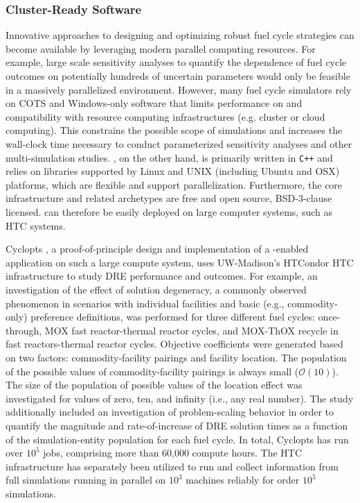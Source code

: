 \subsubsection{Cluster-Ready Software}

Innovative approaches to designing and optimizing robust fuel cycle strategies can become available by leveraging modern parallel computing resources.  For example, large scale sensitivity analyses to quantify the dependence of fuel cycle outcomes on potentially hundreds of uncertain parameters would only be feasible in a massively parallelized environment.
However, many fuel cycle simulators rely on \gls{COTS} and Windows-only software that limits
performance on and compatibility with resource computing infrastructures (e.g. 
cluster or cloud computing). This
constrains the possible scope of simulations and increases the wall-clock time necessary to conduct parameterized sensitivity
analyses and other multi-simulation studies. \Cyclus, on the other hand, is
primarily written in \texttt{C++} and relies on
libraries supported by Linux and UNIX (including Ubuntu and OSX) platforms,
which are flexible and support parallelization.
Furthermore, the core infrastructure and related archetypes are free and
open source, BSD-3-clause licensed.  \Cyclus can therefore be easily deployed
on large computer systems, such as \gls{HTC} systems.

Cyclopts \cite{gidden_cyclopts_2015}, a proof-of-principle design and
implementation of a \Cyclus-enabled application on such a large compute system,
uses UW-Madison's HTCondor \gls{HTC} infrastructure to study DRE performance and
outcomes. For example, an investigation of the effect of solution degeneracy, a
commonly observed phenomenon in scenarios with individual facilities and basic
(e.g., commodity-only) preference definitions, was performed for three different
fuel cycles: once-through, \gls{MOX} fast reactor-thermal reactor cycles, and
\gls{MOX}-\gls{ThOX} recycle in fast reactors-thermal reactor cycles. Objective
coefficients were generated based on two factors: commodity-facility pairings
and facility location. The population of the possible values of
commodity-facility pairings is always small ($\mathcal{O}(10)$). The size of the
population of possible values of the location effect was investigated for values
of zero, ten, and infinity (i.e., any real number). The study additionally
included an investigation of problem-scaling behavior in order to quantify the
magnitude and rate-of-increase of DRE solution times as a function of the
simulation-entity population for each fuel
cycle\cite{gidden_agent-based_2015}. In total, Cyclopts has run over $10^5$
jobs, comprising more than 60,000 compute hours. The \gls{HTC} infrastructure
has separately been utilized to run and collect information from full \Cyclus
simulations running in parallel on $10^3$ machines reliably for order $10^5$
simulations.

